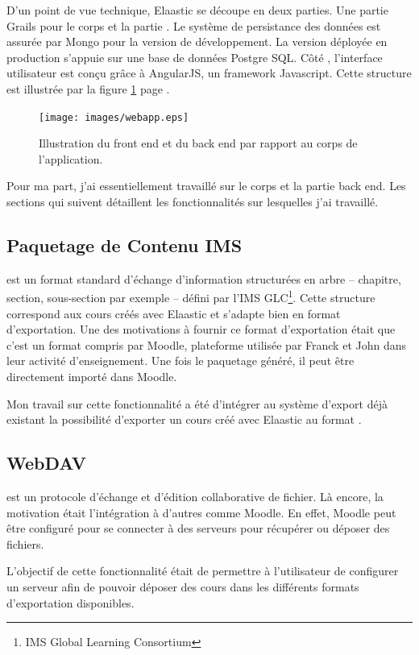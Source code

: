 D'un point de vue technique, Elaastic se découpe en deux parties. Une partie
Grails pour le corps et la partie . Le système de persistance
des données est assurée par Mongo pour la version de développement. La version
déployée en production s'appuie sur une base de données Postgre SQL. Côté
, l'interface utilisateur est conçu grâce à AngularJS, un
framework Javascript. Cette structure est illustrée par la figure
\ref{fig:webapp} page \pageref{fig:webapp}.

\begin{figure}[h]
  \centering
  \texttt{[image: images/webapp.eps]}%
  \caption{Illustration du \og front end \fg{} et du \og back end \fg{} par
rapport au corps de l'application.}
  \label{fig:webapp}
\end{figure}

Pour ma part, j'ai essentiellement travaillé sur le corps et la partie back end.
Les sections qui suivent détaillent les fonctionnalités sur lesquelles j'ai
travaillé.

\subsection{Paquetage de Contenu IMS}
 est un format standard d'échange d'information structurées
en arbre -- chapitre, section, sous-section par exemple -- défini par l'IMS
GLC\footnote{IMS Global Learning Consortium}. Cette structure correspond aux
cours créés avec Elaastic et s'adapte bien en format d'exportation. Une des
motivations à fournir ce format d'exportation était que c'est un format
compris par Moodle, plateforme utilisée par Franck et John dans leur activité
d'enseignement. Une fois le paquetage généré, il peut être directement importé
dans Moodle.

Mon travail sur cette fonctionnalité a été d'intégrer au système d'export déjà
existant la possibilité d'exporter un cours créé avec Elaastic au format
.

\subsection{WebDAV}
 est un protocole d'échange et d'édition collaborative de fichier.
Là encore, la motivation était l'intégration à d'autres  comme
Moodle. En effet, Moodle peut être configuré pour se connecter à des
serveurs  pour récupérer ou déposer des fichiers.

L'objectif de cette fonctionnalité était de permettre à l'utilisateur de
configurer un serveur  afin de pouvoir déposer des cours dans les
différents formats d'exportation disponibles.

